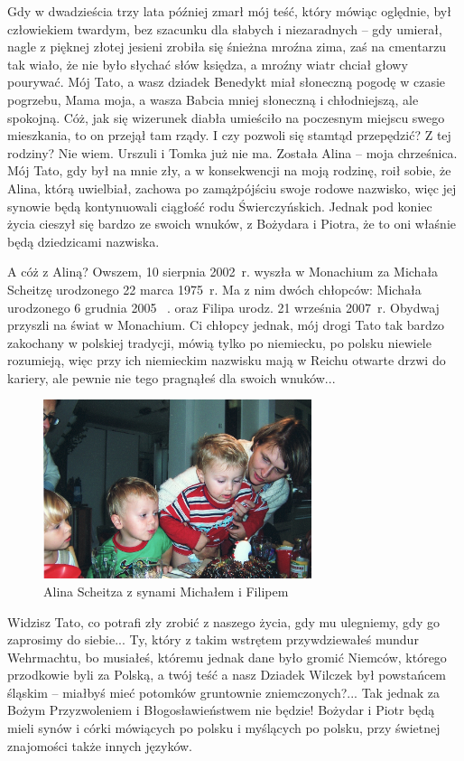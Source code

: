 Gdy w dwadzieścia trzy lata później zmarł mój teść, który mówiąc oględnie, był człowiekiem twardym, bez szacunku dla słabych i niezaradnych – gdy umierał, nagle z pięknej złotej jesieni zrobiła się śnieżna mroźna zima, zaś na cmentarzu tak wiało, że nie było słychać słów księdza, a mroźny wiatr chciał głowy pourywać. Mój Tato, a wasz dziadek Benedykt miał słoneczną pogodę w czasie pogrzebu, Mama moja, a wasza Babcia mniej słoneczną i chłodniejszą, ale spokojną. Cóż, jak się wizerunek diabła umieściło na poczesnym miejscu swego mieszkania, to on przejął tam rządy. I czy pozwoli się stamtąd przepędzić? Z tej rodziny? Nie wiem. Urszuli i Tomka już nie ma. Została Alina – moja chrześnica. Mój Tato, gdy był na mnie zły, a w konsekwencji na moją rodzinę, roił sobie, że Alina, którą uwielbiał, zachowa po zamążpójściu swoje rodowe nazwisko, więc jej synowie będą kontynuowali ciągłość rodu Świerczyńskich. Jednak pod koniec życia cieszył się bardzo ze swoich wnuków, z Bożydara i Piotra, że to oni właśnie będą dziedzicami nazwiska.

A cóż z Aliną? Owszem, 10 sierpnia 2002~r. wyszła w Monachium za Michała Scheitzę urodzonego 22 marca 1975~r. Ma z nim dwóch chłopców: Michała urodzonego 6 grudnia 2005 ~. oraz Filipa urodz. 21 września 2007~r. Obydwaj przyszli na świat w Monachium. Ci chłopcy jednak, mój drogi Tato tak bardzo zakochany w polskiej tradycji, mówią tylko po niemiecku, po polsku niewiele rozumieją, więc przy ich niemieckim nazwisku mają w Reichu otwarte drzwi do kariery, ale pewnie nie tego pragnąłeś dla swoich wnuków...
\begin{figure}[!h]
\begin{center}
\includegraphics[width=0.7\textwidth]{photo/alina_scheitz_z_synami.jpg}
\caption{Alina Scheitza z synami Michałem i Filipem}
\end{center}
\end{figure}

Widzisz Tato, co potrafi zły zrobić z naszego życia, gdy mu ulegniemy, gdy go zaprosimy do siebie... Ty, który z takim wstrętem przywdziewałeś mundur Wehrmachtu, bo musiałeś, któremu jednak dane było gromić Niemców, którego przodkowie byli za Polską, a twój teść a nasz Dziadek Wilczek był powstańcem śląskim – miałbyś mieć potomków gruntownie zniemczonych?... Tak jednak za Bożym Przyzwoleniem i Błogosławieństwem nie będzie! Bożydar i Piotr będą mieli synów i córki mówiących po polsku i myślących po polsku, przy świetnej znajomości także innych języków.
